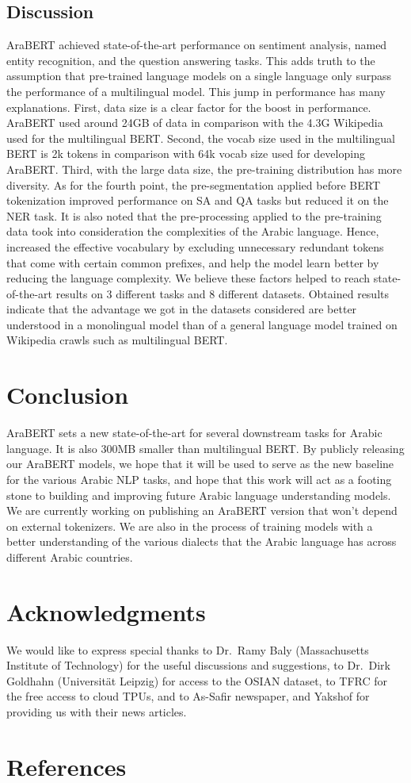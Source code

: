 \documentclass[10pt, a4paper]{article}
\begin{document}
\subsection{Discussion}
AraBERT achieved state-of-the-art performance on sentiment analysis, named entity recognition, and the question answering tasks. This adds truth to the assumption that pre-trained language models on a single language only surpass the performance of a multilingual model. This jump in performance has many explanations. First, data size is a clear factor for the boost in performance. AraBERT used around 24GB of data in comparison with the 4.3G Wikipedia used for the multilingual BERT. Second, the vocab size used in the multilingual BERT is 2k tokens in comparison with 64k vocab size used for developing AraBERT. Third, with the large data size, the pre-training distribution has more diversity. As for the fourth point, the pre-segmentation applied before BERT tokenization improved performance on SA and QA tasks but reduced it on the NER task.
It is also noted that the pre-processing applied to the pre-training data took into consideration the complexities of the Arabic language. Hence, increased the effective vocabulary by excluding unnecessary redundant tokens that come with certain common prefixes, and help the model learn better by reducing the language complexity.
We believe these factors helped to reach state-of-the-art results on 3 different tasks and 8 different datasets. Obtained results indicate that the advantage we got in the datasets considered are better understood in a monolingual model than of a general language model trained on Wikipedia crawls such as multilingual BERT.
 \section{Conclusion}
\label{sec:conclusion}
AraBERT sets a new state-of-the-art for several downstream tasks for Arabic language. It is also  300MB smaller than multilingual BERT. By publicly releasing our AraBERT models, we hope that it will be used to serve as the new baseline for the various Arabic NLP tasks, and hope that this work will act as a footing stone to building and improving future Arabic language understanding models. We are currently working on publishing an AraBERT version that won't depend on external tokenizers. We are also in the process of training models with a better understanding of the various dialects that the Arabic language has across different Arabic countries. \section{Acknowledgments}
We would like to express special thanks to Dr.~Ramy Baly (Massachusetts Institute of Technology)  for the useful discussions and suggestions, to Dr.~Dirk Goldhahn (Universität Leipzig) for access to the OSIAN dataset, to TFRC for the free access to cloud TPUs, and to As-Safir newspaper, and Yakshof for providing us with their news articles.
\section{References}



\label{lr:ref}
\end{document}
